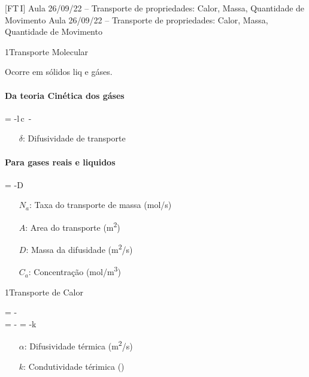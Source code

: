 \documentclass[\mainfilename]{subfiles}
\begin{document}
[FT\,I]
{Aula 26/09/22 -- Transporte de propriedades: Calor, Massa, Quantidade de Movimento}
{Aula 26/09/22 -- Transporte de propriedades: Calor, Massa, Quantidade de Movimento}

\begin{sectionBox}1{Transporte Molecular}
    
    Ocorre em sólidos liq e gáses.

    \paragraph*{Da teoria Cinética dos gáses}
    \begin{BM}
        \Psi
        = -l\,c\,
        \cong 
        -\delta\,
    \end{BM}
    \begin{itemize}
        \item[\(\delta\):] Difusividade de transporte
    \end{itemize}

    \paragraph*{Para gases reais e liquidos}
    \begin{BM}
         = -D\,
    \end{BM}
    \begin{itemize}
        \item[\(N_a\):] Taxa do transporte de massa (\si{\mole/\second})
        \item[\(A\):] Area do transporte (\si{\metre^2})
        \item[\(D\):] Massa da difusidade (\si{\metre^2/\second})
        \item[\(C_a\):] Concentração (\si{\mole/\metre^3}) 
    \end{itemize}
    
\end{sectionBox}

\begin{sectionBox}1{Transporte de Calor}
    
    \begin{BM}
        \Psi
        = -\delta\,
        \\
        = -\alpha
        = -k\,
    \end{BM}
    \begin{itemize}
        \item[\(\alpha\):] Difusividade térmica (\si{\metre^2/\second})
        \item[\(k\):] Condutividade térimica (\si{\frac{\joule}{\metre\,\celsius\,\second}})
    \end{itemize}
    
\end{sectionBox}
\end{document}
